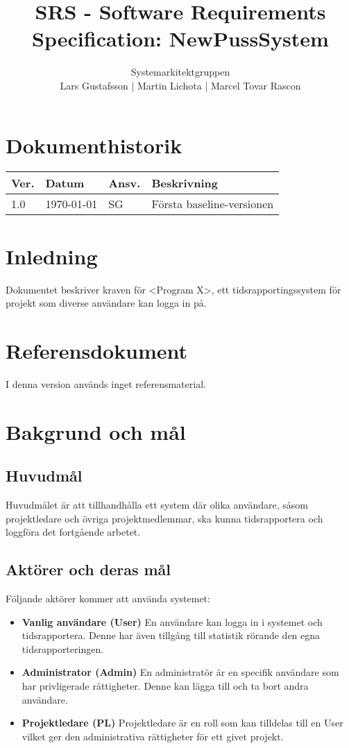 \documentclass[a4paper]{article}
\title{SRS - Software Requirements Specification: NewPussSystem}
\author{Systemarkitektgruppen \\ Lars Gustafsson | Martin Lichota | Marcel Tovar Rascon}
\date{}
\begin{document}
\maketitle
\thispagestyle{fancy}
\tableofcontents
\newpage

\section*{Dokumenthistorik}

\begin{tabular}{ l l l l }
Ver. & Datum & Ansv. & Beskrivning \\\hline
1.0 & \today & SG & Första baseline-versionen

\end{tabular}
\section{Inledning}       


Dokumentet beskriver kraven för <Program X>, ett tidsrapportingssystem för projekt som diverse användare kan logga in på.

\section{Referensdokument}
I denna version används inget referensmaterial.
\section{Bakgrund och mål}   
\subsection{Huvudmål}
Huvudmålet är att tillhandhålla ett system där olika användare, såsom projektledare och övriga projektmedlemmar, ska kunna tidsrapportera och loggföra det fortgående arbetet. 

\subsection{Aktörer och deras mål}
Följande aktörer kommer att använda systemet:
\begin{itemize}
\item [] \textbf{Vanlig användare (User)} En användare kan logga in i systemet och tidsrapportera. Denne har även tillgång till statistik rörande den egna tidsrapporteringen.
\item [] \textbf{Administrator (Admin)} En administratör är en specifik användare som har privligerade rättigheter. Denne kan lägga till och ta bort andra användare.
\item [] \textbf{Projektledare (PL)} Projektledare är en roll som kan tilldelas till en User vilket ger den administrativa rättigheter för ett givet projekt.
\end{itemize}
\end{document}
